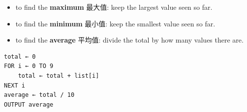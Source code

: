 \documentclass[11pt]{article}
\begin{document}
\begin{itemize}
\item to find the \textbf{maximum} 最大值: keep the largest value seen so far.

\item to find the \textbf{minimum} 最小值: keep the smallest value seen so far.

\item to find the \textbf{average} 平均值: divide the total by how many values there are.

\end{itemize}

\begin{Verbatim}
total ← 0
FOR i ← 0 TO 9
    total ← total + list[i]
NEXT i
average ← total / 10
OUTPUT average
\end{Verbatim}
\end{document}
